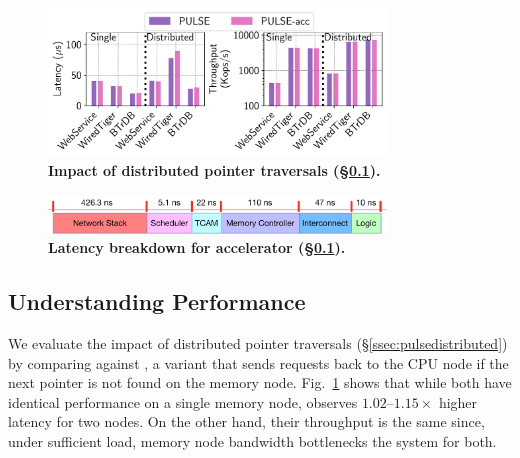 \begin{figure}[t]
\centering
\includegraphics[width=0.8\textwidth]{fig/pulse/breakdown.pdf}%
\caption[Impact of distributed pointer traversals]{\textbf{Impact of distributed pointer traversals (\S\ref{ssec:pulsebreakdown}).}}
\label{fig:eval_breakdown}
\end{figure}

\begin{figure}[t]
  \centering	
  \includegraphics[width=0.8\textwidth]{fig/pulse/breakdown_latency_new.pdf}
  \caption[Latency breakdown for \pulse accelerator ]{\textbf{Latency breakdown for \pulse accelerator (\S\ref{ssec:pulsebreakdown}).}}
  \label{fig:eval_breakdown_latency_}
\end{figure}




\subsection{Understanding \pulse Performance}
\label{ssec:pulsebreakdown}




 We evaluate the impact of distributed pointer traversals (\S\ref{ssec:pulsedistributed}) by comparing \pulse against \pulseacc, a \pulse variant that sends requests back to the CPU node if the next pointer is not found on the memory node. Fig.~\ref{fig:eval_breakdown} shows that while both have identical performance on a single memory node, \pulseacc observes $1.02$--$1.15\times$ higher latency for two nodes. On the other hand, their throughput is the same since, under sufficient load, memory node bandwidth bottlenecks the system for both.


